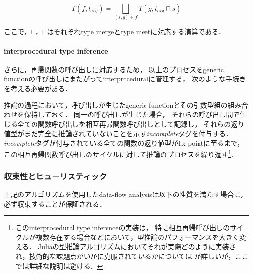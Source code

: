 \[
  T(f,t_{arg}) = \bigsqcup_{(s,g) \in f}T(g,t_{arg} \sqcap s)
\]

ここで，\(\sqcup\)，\(\sqcap\)はそれぞれtype mergeとtype meetに対応する演算である．


\paragraph{interprocedural type inference}

さらに，再帰関数の呼び出しに対応するため，
以上のプロセスをgeneric functionの呼び出しにまたがってinterproceduralに管理する，
次のような手続きを考える必要がある．

推論の過程において，呼び出しが生じたgeneric functionとその引数型組の組み合わせを保持しておく．
同一の呼び出しが生じた場合，
それらの呼び出し間で生じる全ての関数呼び出しを相互再帰関数呼び出しとして記録し，
それらの返り値型がまだ完全に推論されていないことを示す\textit{incomplete}タグを付与する．
\textit{incomplete}タグが付与されている全ての関数の返り値型がfix-pointに至るまで，
この相互再帰関数呼び出しのサイクルに対して推論のプロセスを繰り返す\footnote{
  このinterprocedural type inferenceの実装は，
  特に相互再帰呼び出しのサイクルが複数存在する場合などにおいて，型推論のパフォーマンスを大きく変える．
  Juliaの型推論アルゴリズムにおいてそれが実際どのように実装され，技術的な課題点がいかに克服されているかについては
  \cite{jameson, jameson-revisited}が詳しいが，ここでは詳細な説明は避ける．
}．

\subsubsection{収束性とヒューリスティック} \label{subsubsection:inference-convergence-and-heuristic}

上記のアルゴリズムを使用したdata-flow analysisは以下の性質を満たす場合に，
必ず収束することが保証される\cite{graph-free-data-flow-analysis, jameson}．

